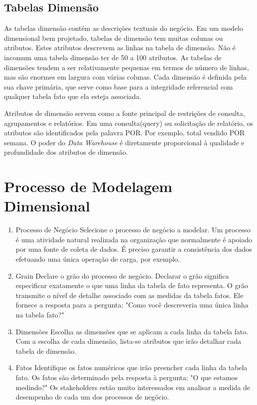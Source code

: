 \subsection{Tabelas Dimensão}
As tabelas dimensão contém as descrições textuais do negócio. Em um modelo dimensional bem projetado, tabelas de dimensão tem muitas colunas ou atributos. Estes atributos descrevem as linhas na tabela de dimensão. Não é incomum uma tabela dimensão ter de 50 a 100 atributos. As tabelas de dimensões tendem a ser relativamente pequenas em termos de número de linhas, mas são enormes em largura com várias colunas. Cada dimensão é definida pela sua chave primária, que serve como base para a integridade referencial com qualquer tabela fato que ela esteja associada.

Atributos de dimensão servem como a fonte principal de restrições de consulta, agrupamentos e relatórios. Em uma consulta(query) ou solicitação de relatório, os atributos são identificados pela palavra POR. Por exemplo, total vendido POR semana. O poder do \textit{Data Warehouse} é diretamente proporcional à qualidade e profundidade dos atributos de dimensão.

\section{Processo de Modelagem Dimensional}
\begin{enumerate}
	\item Processo de Negócio
Selecione o processo de negócio a modelar.
Um processo é uma atividade natural realizada na organização que normalmente é apoiado por uma fonte de coleta de dados. É preciso garantir a consistência dos dados efetuando uma única operação de carga, por exemplo.
	\item Grain 
Declare o grão do processo de negócio.
Declarar o grão significa especificar exatamente o que uma linha da tabela de fato representa. O grão transmite o nível de detalhe associado com as medidas da tabela fatos. Ele fornece a resposta para a pergunta: "Como você descreveria uma única linha na tabela fato?"
	\item Dimensões 
Escolha as dimensões que se aplicam a cada linha da tabela fato.
Com a escolha de cada dimensão, lista-se atributos que irão detalhar cada tabela de dimensão.
	\item Fatos 
Identifique os fatos numéricos que irão preencher cada linha da tabela fato.
Os fatos são determinado pela resposta à pergunta: "O que estamos medindo?"
Os stakeholders estão muito interessados em analisar a medida de desempenho de cada um dos processos de negócio.
\end{enumerate}

